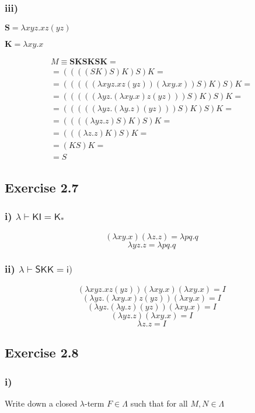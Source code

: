 \documentclass[11pt]{article}
\begin{document}
\subsubsection*{iii)}
$\mathbf{S} = \lambda xyz.xz(yz)$

$\mathbf{K} = \lambda xy.x$

\begin{gather*}
M \equiv \mathbf{SKSKSK} = \\
= ((((SK)S)K)S)K = \\
= (((((\lambda xyz.xz(yz))(\lambda xy.x))S)K)S)K = \\
= (((((\lambda yz.(\lambda xy.x)z(yz)))S)K)S)K = \\
= (((((\lambda yz.(\lambda y.z)(yz)))S)K)S)K = \\
= ((((\lambda yz.z)S)K)S)K = \\
= (((\lambda z.z)K)S)K = \\
= (KS)K = \\
= S
\end{gather*}

\subsection*{Exercise 2.7}
\subsubsection*{i) {\boldmath $\mathsf{\lambda \vdash KI = K_*}$}}

\[
(\lambda xy.x)(\lambda z.z) = \lambda pq.q
\]
\[
\lambda yz.z = \lambda pq.q
\]


\subsubsection*{ii) {\boldmath $\mathsf{\lambda \vdash SKK = i)}$}}

\[
(\lambda xyz.xz(yz)) (\lambda xy.x) (\lambda xy.x) = I
\]
\[
(\lambda yz. (\lambda xy.x)z(yz)) (\lambda xy.x) = I
\]
\[
(\lambda yz. (\lambda y.z)(yz)) (\lambda xy.x) = I
\]
\[
(\lambda yz.z) (\lambda xy.x) = I
\]
\[
\lambda z.z = I
\]

\subsection*{Exercise 2.8}

\subsubsection*{i)}
Write down a closed $\lambda$-term $F \in \Lambda$ such that for all $M,N \in \Lambda$
\end{document}
